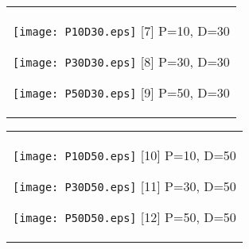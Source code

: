 \documentclass[a4paper,11pt,oneside,openany]{jsbook}
\begin{document}
\begin{figure}[htbp]
  \begin{center}
    \begin{tabular}{c}


      \begin{minipage}{0.33\hsize}
        \begin{center}
          \texttt{[image: P10D30.eps]}
          \hspace{1.2cm} [7] P=10, D=30
        \end{center}
      \end{minipage}

      \begin{minipage}{0.33\hsize}
        \begin{center}
          \texttt{[image: P30D30.eps]}
          \hspace{1.2cm} [8] P=30, D=30
        \end{center}
      \end{minipage}

      \begin{minipage}{0.33\hsize}
        \begin{center}
          \texttt{[image: P50D30.eps]}
          \hspace{1.2cm} [9] P=50, D=30
        \end{center}
      \end{minipage}
    \end{tabular}
  \end{center}
\end{figure}
\begin{figure}[htbp]
  \begin{center}
    \begin{tabular}{c}


      \begin{minipage}{0.33\hsize}
        \begin{center}
          \texttt{[image: P10D50.eps]}
          \hspace{1.2cm} [10] P=10, D=50
        \end{center}
      \end{minipage}

      \begin{minipage}{0.33\hsize}
        \begin{center}
          \texttt{[image: P30D50.eps]}
          \hspace{1.2cm} [11] P=30, D=50
        \end{center}
      \end{minipage}

      \begin{minipage}{0.33\hsize}
        \begin{center}
          \texttt{[image: P50D50.eps]}
          \hspace{1.2cm} [12] P=50, D=50
        \end{center}
      \end{minipage}
    \end{tabular}
  \end{center}
\end{figure}
\end{document}
